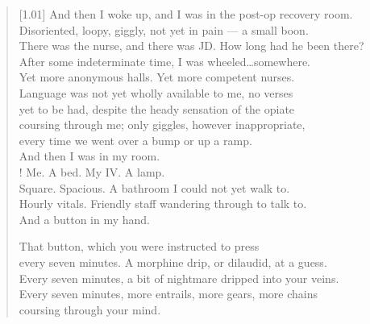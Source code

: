 \begin{verse}[1.01\textwidth]
  And then I woke up, and I was in the post-op recovery room.\\
  Disoriented, loopy, giggly, not yet in pain --- a small boon.\\
  There was the nurse, and there was JD. How long had he been there?\\
  After some indeterminate time, I was wheeled\ldots{}somewhere.\\
  Yet more anonymous halls. Yet more competent nurses.\\
  Language was not yet wholly available to me, no verses\\
  yet to be had, despite the heady sensation of the opiate\\
  coursing through me; only giggles, however inappropriate,\\
  every time we went over a bump or up a ramp.\\
  And then I was in my room.\\!
   Me. A bed. My IV. A lamp.\\
  Square. Spacious. A bathroom I could not yet walk to.\\
  Hourly vitals. Friendly staff wandering through to talk to.\\
  And a button in my hand.

  \begin{ally}
    \noindent That button, which you were instructed to press\\
  \noindent every seven minutes. A morphine drip, or dilaudid, at a guess.\\
  \noindent Every seven minutes, a bit of nightmare dripped into your veins.\\
  \noindent Every seven minutes, more entrails, more gears, more chains\\
  \noindent coursing through your mind.
\end{ally}


\end{verse}
